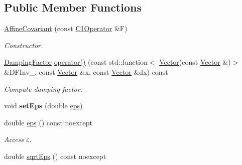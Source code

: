\subsection*{Public Member Functions}
\begin{DoxyCompactItemize}
\item 
\hyperlink{classSpacy_1_1Newton_1_1Damping_1_1AffineCovariant_abf3615a91c70a145759d74eff761ec51}{Affine\+Covariant} (const \hyperlink{classSpacy_1_1C1Operator}{C1\+Operator} \&F)\hypertarget{classSpacy_1_1Newton_1_1Damping_1_1AffineCovariant_abf3615a91c70a145759d74eff761ec51}{}\label{classSpacy_1_1Newton_1_1Damping_1_1AffineCovariant_abf3615a91c70a145759d74eff761ec51}

\begin{DoxyCompactList}\small\item\em Constructor. \end{DoxyCompactList}\item 
\hyperlink{classSpacy_1_1DampingFactor}{Damping\+Factor} \hyperlink{classSpacy_1_1Newton_1_1Damping_1_1AffineCovariant_a451040d8a986f1ae912b34713ced26ec}{operator()} (const std\+::function$<$ \hyperlink{classSpacy_1_1Vector}{Vector}(const \hyperlink{classSpacy_1_1Vector}{Vector} \&)$>$ \&D\+F\+Inv\+\_\+, const \hyperlink{classSpacy_1_1Vector}{Vector} \&x, const \hyperlink{classSpacy_1_1Vector}{Vector} \&dx) const \hypertarget{classSpacy_1_1Newton_1_1Damping_1_1AffineCovariant_a451040d8a986f1ae912b34713ced26ec}{}\label{classSpacy_1_1Newton_1_1Damping_1_1AffineCovariant_a451040d8a986f1ae912b34713ced26ec}

\begin{DoxyCompactList}\small\item\em Compute damping factor. \end{DoxyCompactList}\item 
void {\bfseries set\+Eps} (double \hyperlink{classSpacy_1_1Mixin_1_1Eps_a40e2ba8f3abd2b5370ef41238cfaaf8b}{eps})\hypertarget{classSpacy_1_1Mixin_1_1Eps_a1bbfd62541610d5d80f2782ab77158e4}{}\label{classSpacy_1_1Mixin_1_1Eps_a1bbfd62541610d5d80f2782ab77158e4}

\item 
double \hyperlink{classSpacy_1_1Mixin_1_1Eps_a40e2ba8f3abd2b5370ef41238cfaaf8b}{eps} () const noexcept\hypertarget{classSpacy_1_1Mixin_1_1Eps_a40e2ba8f3abd2b5370ef41238cfaaf8b}{}\label{classSpacy_1_1Mixin_1_1Eps_a40e2ba8f3abd2b5370ef41238cfaaf8b}

\begin{DoxyCompactList}\small\item\em Access $\varepsilon$. \end{DoxyCompactList}\item 
double \hyperlink{classSpacy_1_1Mixin_1_1Eps_a29e8c25dc3f1fdede57b8eb06f520fe1}{sqrt\+Eps} () const noexcept\hypertarget{classSpacy_1_1Mixin_1_1Eps_a29e8c25dc3f1fdede57b8eb06f520fe1}{}\label{classSpacy_1_1Mixin_1_1Eps_a29e8c25dc3f1fdede57b8eb06f520fe1}


\end{DoxyCompactItemize}
